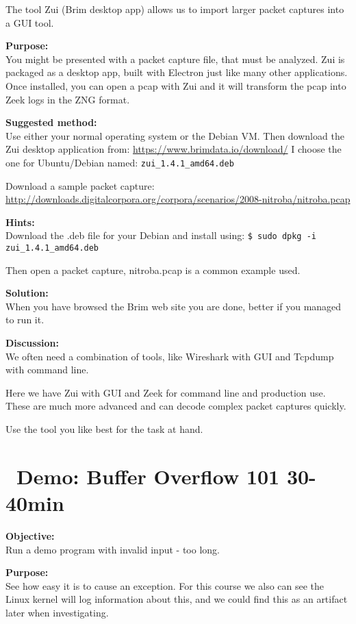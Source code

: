 \documentclass[a4paper,11pt,notitlepage]{report}
\begin{document}
The tool Zui (Brim desktop app) allows us to import larger packet captures into a GUI tool.

{\bf Purpose:}\\
You might be presented with a packet capture file, that must be analyzed. Zui is packaged as a desktop app, built with Electron just like many other applications. Once installed, you can open a pcap with Zui and it will transform the pcap into Zeek logs in the ZNG format.

{\bf Suggested method:}\\
Use either your normal operating system or the Debian VM. Then download the Zui desktop application from:
\url{https://www.brimdata.io/download/} I choose the one for Ubuntu/Debian named: \verb+zui_1.4.1_amd64.deb+

Download a sample packet capture:\\
\url{http://downloads.digitalcorpora.org/corpora/scenarios/2008-nitroba/nitroba.pcap}


{\bf Hints:}\\
Download the .deb file for your Debian and install using:
\verb+$ sudo dpkg -i zui_1.4.1_amd64.deb+

Then open a packet capture, nitroba.pcap is a common example used.

{\bf Solution:}\\
When you have browsed the Brim web site you are done, better if you managed to run it.

{\bf Discussion:}\\
We often need a combination of tools, like Wireshark with GUI and Tcpdump with command line.

Here we have Zui with GUI and Zeek for command line and production use. These are much more advanced and can decode complex packet captures quickly.

Use the tool you like best for the task at hand.



\chapter{\faInfoCircle\ Demo: Buffer Overflow 101 30-40min}
\label{ex:bufferoverflow}


{\bf Objective:}\\
Run a demo program with invalid input - too long.

{\bf Purpose:}\\
See how easy it is to cause an exception. For this course we also can see the Linux kernel will log information about this, and we could find this as an artifact later when investigating.
\end{document}
